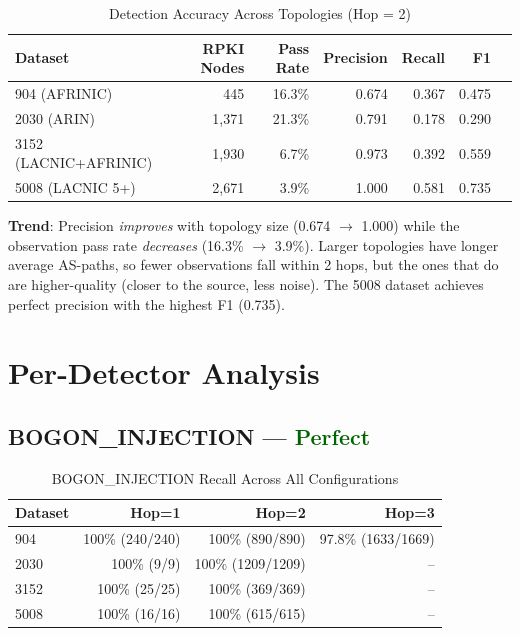 \documentclass[11pt,a4paper]{article}
\begin{document}
\begin{table}[H]
\centering
\caption{Detection Accuracy Across Topologies (Hop = 2)}
\begin{tabular}{lrrrrrr}
\toprule
\textbf{Dataset} & \textbf{RPKI Nodes} & \textbf{Pass Rate} & \textbf{Precision} & \textbf{Recall} & \textbf{F1} \\
\midrule
904  (AFRINIC)         & 445   & 16.3\% & 0.674 & 0.367 & 0.475 \\
2030 (ARIN)            & 1,371 & 21.3\% & 0.791 & 0.178 & 0.290 \\
3152 (LACNIC+AFRINIC)  & 1,930 & 6.7\%  & 0.973 & 0.392 & 0.559 \\
5008 (LACNIC 5+)       & 2,671 & 3.9\%  & 1.000 & 0.581 & 0.735 \\
\bottomrule
\end{tabular}
\end{table}

\textbf{Trend}: Precision \emph{improves} with topology size (0.674 $\to$ 1.000)
while the observation pass rate \emph{decreases} (16.3\% $\to$ 3.9\%). Larger
topologies have longer average AS-paths, so fewer observations fall within
2 hops, but the ones that do are higher-quality (closer to the source, less noise).
The 5008 dataset achieves perfect precision with the highest F1 (0.735).

\section{Per-Detector Analysis}

\subsection{BOGON\_INJECTION --- \textcolor{darkgreen}{Perfect}}

\begin{table}[H]
\centering
\caption{BOGON\_INJECTION Recall Across All Configurations}
\begin{tabular}{l|rrr}
\toprule
\textbf{Dataset} & \textbf{Hop=1} & \textbf{Hop=2} & \textbf{Hop=3} \\
\midrule
904   & 100\% (240/240) & 100\% (890/890)     & 97.8\% (1633/1669) \\
2030  & 100\% (9/9)     & 100\% (1209/1209)   & -- \\
3152  & 100\% (25/25)   & 100\% (369/369)     & -- \\
5008  & 100\% (16/16)   & 100\% (615/615)     & -- \\
\bottomrule
\end{tabular}
\end{table}
\end{document}
